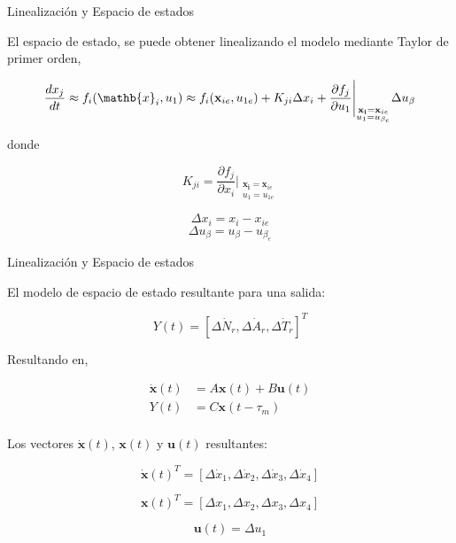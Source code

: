 \documentclass{beamer}
\begin{document}
\begin{frame}{Linealización y Espacio de estados}
\begin{justify}
El espacio de estado, se puede obtener linealizando el modelo mediante Taylor de primer orden,
{\footnotesize
$$
\frac{dx_j}{dt} \approx f_i(\mathb {x}_{i}, u_{1}) \approx f_i(\mathbf{x}_{ie}, u_{1e}) + K_{ji}  \Delta x_i + \frac{\partial f_j}{\partial u_1} \Bigg|_{\substack{\mathbf{x_i}=\mathbf{x}_{ie} \\ u_1 =u_{\beta_e}}} \Delta u_{\beta} 
$$

donde

$$ K_{ji} = \frac{\partial f_j}{\partial x_i} \Bigg|_{\substack{\mathbf{x_i}=\mathbf{x}_{ie} \\ u_1 =u_{1e}}}
$$

$$\Delta x_i = x_i - x_{ie}$$
$$\Delta u_{\beta} = u_{\beta} - u_{\beta_e}$$


}
\end{justify}
\end{frame}



\begin{frame}{Linealización y Espacio de estados}
\begin{justify}

{\footnotesize
El modelo de espacio de estado resultante para una salida:

$$Y(t)=[\Delta\dot N_r,  \Delta\dot A_r,  \Delta\dot T_r  ]^T$$

Resultando en,

\begin{align*}
\dot{\mathbf{x}}(t) & = A\mathbf{x}(t) + B\mathbf{u}(t) \\
Y(t) & = C\mathbf{x}(t-\tau_m) \\
\end{align*}

Los vectores $\dot{\mathbf{x}}(t)$, $\mathbf{x}(t)$ y $\mathbf{u}(t)$ resultantes:

$$
\dot{\mathbf{x}}(t)^T = [\Delta  \dot{x}_1, \Delta \dot{x}_2, \Delta \dot{x}_3, \Delta \dot{x}_4]
$$

$$
{\mathbf{x}}(t)^T = [\Delta{x}_1, \Delta {x}_2, \Delta {x}_3, \Delta {x}_4]
$$

$$
{\mathbf{u}}(t) = \Delta u_1
$$
}
\end{justify}
\end{frame}
\end{document}
